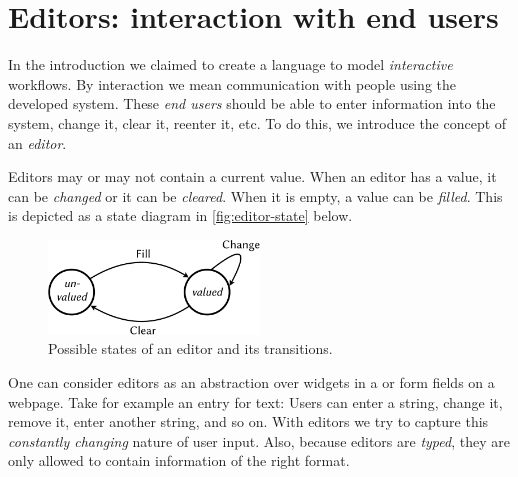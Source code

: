 
\section{Editors: interaction with end users}

In the introduction we claimed to create a language to model \emph{interactive} workflows.
By interaction we mean communication with people using the developed system.
These \emph{end users} should be able to enter information into the system,
change it, clear it, reenter it, etc.
To do this, we introduce the concept of an \emph{editor}.

Editors may or may not contain a current value.
When an editor has a value, it can be \emph{changed} or it can be \emph{cleared}.
When it is empty, a value can be \emph{filled}.
This is depicted as a state diagram in \autoref{fig:editor-state} below.

\begin{figure}
  \centering
  \includegraphics[width=0.5\textwidth]{figures/editor-state-crop.pdf}
  \caption{Possible states of an editor and its transitions.}
  \label{fig:editor-state}
\end{figure}

One can consider editors as an abstraction over widgets in a \GUI or form fields on a webpage.
Take for example an entry for text:
Users can enter a string, change it, remove it, enter another string, and so on.
With editors we try to capture this \emph{constantly changing} nature of user input.
Also, because editors are \emph{typed},
they are only allowed to contain information of the right format.

